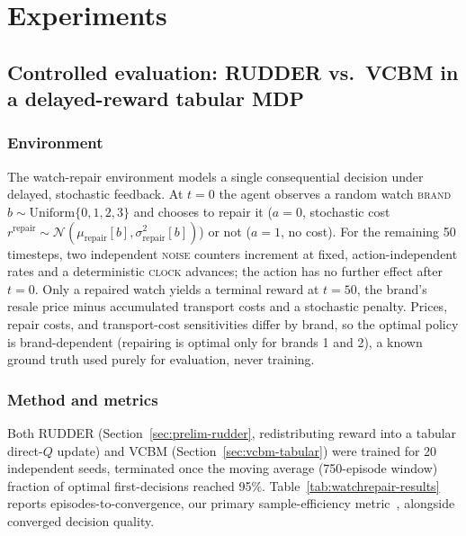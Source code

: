
\section{Experiments}
\label{sec:experiments}

\subsection{Controlled evaluation: RUDDER vs.\ VCBM in a delayed-reward tabular MDP}
\label{sec:exp-watchrepair}

\subsubsection{Environment}
The watch-repair environment models a single consequential decision under delayed, stochastic feedback. At $t=0$ the agent observes a random watch \textsc{brand} $b \sim \mathrm{Uniform}\{0,1,2,3\}$ and chooses to repair it ($a=0$, stochastic cost $r^{\mathrm{repair}} \sim \mathcal{N}(\mu_{\mathrm{repair}}[b], \sigma^2_{\mathrm{repair}}[b])$) or not ($a=1$, no cost). For the remaining 50 timesteps, two independent \textsc{noise} counters increment at fixed, action-independent rates and a deterministic \textsc{clock} advances; the action has no further effect after $t=0$. Only a repaired watch yields a terminal reward at $t=50$, the brand's resale price minus accumulated transport costs and a stochastic penalty. Prices, repair costs, and transport-cost sensitivities differ by brand, so the optimal policy is brand-dependent (repairing is optimal only for brands 1 and 2), a known ground truth used purely for evaluation, never training.

\subsubsection{Method and metrics}
Both RUDDER (Section~\ref{sec:prelim-rudder}, redistributing reward into a tabular direct-$Q$ update) and VCBM (Section~\ref{sec:vcbm-tabular}) were trained for 20 independent seeds, terminated once the moving average (750-episode window) fraction of optimal first-decisions reached 95\%. Table~\ref{tab:watchrepair-results} reports episodes-to-convergence, our primary sample-efficiency metric~\cite{levine2020offlinerl}, alongside converged decision quality.


